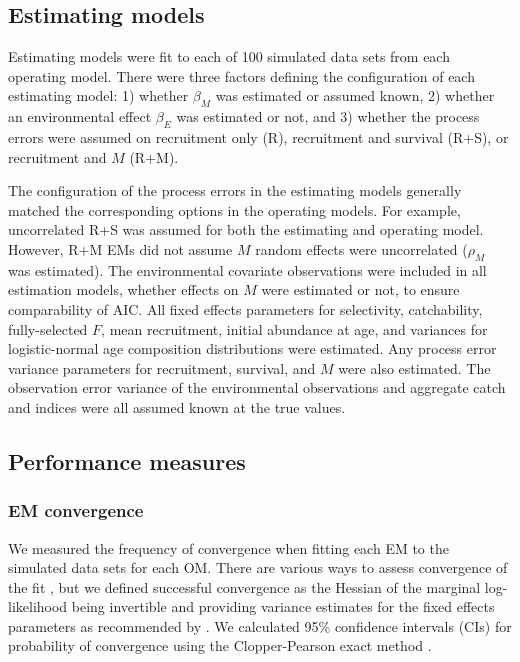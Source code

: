 \documentclass[
  12pt,
]{article}
\begin{document}
\hypertarget{estimating-models}{%
\subsection*{Estimating models}\label{estimating-models}}

Estimating models were fit to each of 100 simulated data sets from each operating model. There were three factors defining the configuration of each estimating model: 1) whether \(\beta_M\) was estimated or assumed known, 2) whether an environmental effect \(\beta_E\) was estimated or not, and 3) whether the process errors were assumed on recruitment only (R), recruitment and survival (R+S), or recruitment and \(M\) (R+M).

The configuration of the process errors in the estimating models generally matched the corresponding options in the operating models. For example, uncorrelated R+S was assumed for both the estimating and operating model. However, R+M EMs did not assume \(M\) random effects were uncorrelated (\(\rho_M\) was estimated). The environmental covariate observations were included in all estimation models, whether effects on \(M\) were estimated or not, to ensure comparability of AIC. All fixed effects parameters for selectivity, catchability, fully-selected \(F\), mean recruitment, initial abundance at age, and variances for logistic-normal age composition distributions were estimated. Any process error variance parameters for recruitment, survival, and \(M\) were also estimated. The observation error variance of the environmental observations and aggregate catch and indices were all assumed known at the true values.

\hypertarget{performance-measures}{%
\subsection*{Performance measures}\label{performance-measures}}

\hypertarget{em-convergence}{%
\subsubsection*{EM convergence}\label{em-convergence}}

We measured the frequency of convergence when fitting each EM to the simulated data sets for each OM. There are various ways to assess convergence of the fit \citep[e.g.,][]{carvalhoetal21}, but we defined successful convergence as the Hessian of the marginal log-likelihood being invertible and providing variance estimates for the fixed effects parameters as recommended by \citet{milleretal_inreview1}. We calculated 95\% confidence intervals (CIs) for probability of convergence using the Clopper-Pearson exact method \citep{clopperpearson34, thulin14}.
\end{document}
